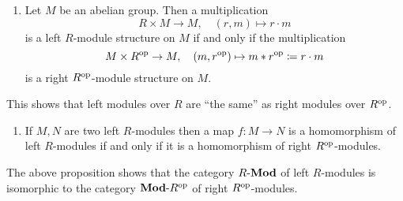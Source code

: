 \begin{proposition}
  \label{proposition: left right modules under op}
  \leavevmode
  \begin{enumerate}
    \item
      Let $M$ be an abelian group.
      Then a multiplication
      \[
                R \times M 
        \to     M,
        \quad   (r,m)
        \mapsto r \cdot m
      \]
      is a left $R$-module structure on $M$ if and only if the multiplication
      \[
                  M \times R^{\operatorname{op}}
        \to       M,
        \quad     (m, r^{\operatorname{op}})
        \mapsto   m * r^{\operatorname{op}}
        \coloneqq  r \cdot m
      \]
      is a right $R^{\operatorname{op}}$-module structure on $M$.
  \end{enumerate}
  This shows that left modules over $R$ are \enquote{the same} as right modules over $R^{\operatorname{op}}$.
  \begin{enumerate}[resume]
    \item
      If $M, N$ are two left $R$-modules then a map $f \colon M \to N$ is a homomorphism of left $R$-modules if and only if it is a homomorphism of right $R^{\operatorname{op}}$-modules.
  \end{enumerate}
\end{proposition}




\begin{remark}
  The above proposition shows that the category $R\text{-}\mathbf{Mod}$ of left $R$-modules is isomorphic to the category $\mathbf{Mod}\text{-}R^{\operatorname{op}}$ of right $R^{\operatorname{op}}$-modules.
\end{remark}


